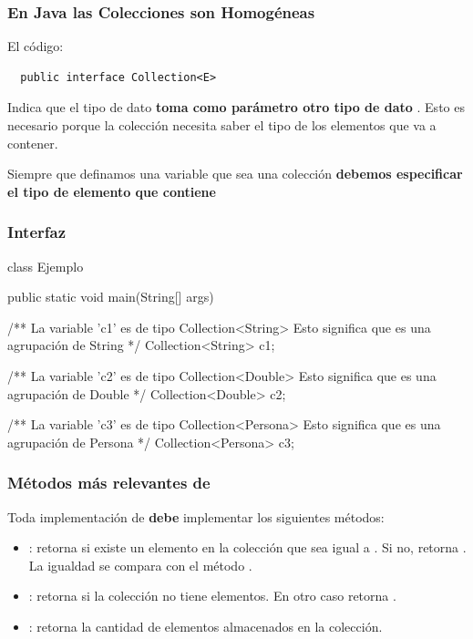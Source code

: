 \documentclass{beamer}
\begin{document}
\begin{frame}[fragile]
  \frametitle{En Java las Colecciones son Homogéneas}

  El código:

\begin{verbatim}
  public interface Collection<E>
\end{verbatim}

  Indica que el tipo de dato  \textbf{toma como
    parámetro otro tipo de dato} . Esto es necesario porque
  la colección necesita saber el tipo de los elementos que va a
  contener.

  \begin{alertblock}{}
    Siempre que definamos una variable que sea una colección
    \textbf{debemos especificar el tipo de elemento que contiene}
  \end{alertblock}

  
  
\end{frame}

\begin{frame}[fragile]
  \frametitle{Interfaz }

\begin{jsmall}
class Ejemplo {

  public static void main(String[] args) {
    /** La variable 'c1' es de tipo Collection<String>
    Esto significa que es una agrupación de String */
    Collection<String> c1;

    /** La variable 'c2' es de tipo Collection<Double>
    Esto significa que es una agrupación de Double */
    Collection<Double> c2;

    /** La variable 'c3' es de tipo Collection<Persona>
    Esto significa que es una agrupación de Persona */
    Collection<Persona> c3;
  }
}
\end{jsmall}
  
\end{frame}

\begin{frame}[fragile]
  \frametitle{Métodos más relevantes de }

  Toda implementación de  \textbf{debe}
  implementar los siguientes métodos:

  \begin{itemize}
    
  \item {}: retorna  si
    existe un elemento en la colección que sea igual a . Si
    no, retorna . La igualdad se compara con el método
    .
    
  \item {}: retorna  si la
    colección no tiene elementos. En otro caso retorna .
    
  \item {}: retorna la cantidad de elementos
    almacenados en la colección.
    
  \end{itemize}
  
\end{frame}
\end{document}
